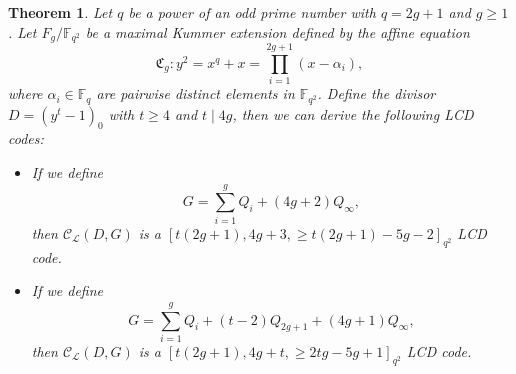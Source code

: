\documentclass[journal,12pt,onecolumn]{IEEEtran}
\newtheorem{theorem}{Theorem}
\begin{document}
\begin{theorem}\label{LCD_HyperEC}
    Let $q$ be a power of an odd prime number with $q=2g+1$ and $g\ge1$. Let $F_g/\mathbb{F}_{q^2}$ be a maximal Kummer extension defined by the affine equation
    \[
        \mathfrak{C}_g: y^2 = x^q+x = \prod_{i=1}^{2g+1}(x-\alpha_i),
    \]
    where $\alpha_i\in\mathbb{F}_q$ are pairwise distinct elements in $\mathbb{F}_{q^2}$. Define the divisor $D = (y^t-1)_0$ with $t\ge4$ and $t\mid 4g$, then we can derive the following LCD codes:   
    \begin{itemize}
        \item[(1)] If we define 
        \[
            G = \sum_{i=1}^g Q_i + (4g+2)Q_\infty,
        \]
        then $\mathcal{C}_{\mathcal{L}}(D,G)$ is a $[t(2g+1),4g+3,\ge t(2g+1)-5g-2]_{q^2}$ LCD code. 
        \item[(2)] If we define 
        \[
            G = \sum_{i=1}^g Q_i + (t-2)Q_{2g+1} + (4g+1)Q_\infty,
        \]
        then $\mathcal{C}_{\mathcal{L}}(D,G)$ is a $[t(2g+1),4g+t,\ge 2tg-5g+1]_{q^2}$ LCD code. 
    \end{itemize}
\end{theorem}
\end{document}
